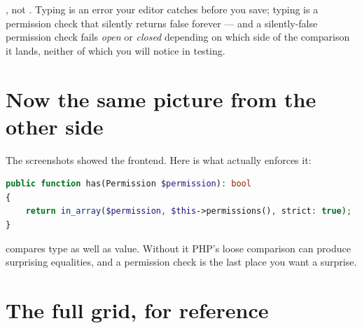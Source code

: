 , not . Typing
 is an error your editor catches before you
save; typing  is a permission check that silently returns
false forever --- and a silently-false permission check fails \emph{open} or
\emph{closed} depending on which side of the comparison it lands, neither of
which you will notice in testing.

\section{Now the same picture from the other side}

The screenshots showed the frontend. Here is what actually enforces it:

\begin{lstlisting}[language=PHP]
public function has(Permission $permission): bool
{
    return in_array($permission, $this->permissions(), strict: true);
}
\end{lstlisting}

 compares type as well as value. Without it PHP's loose
comparison can produce surprising equalities, and a permission check is the last
place you want a surprise.


\section{The full grid, for reference}

